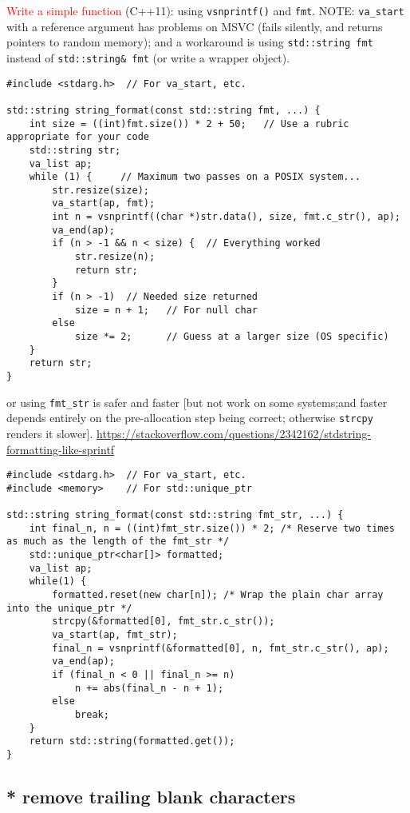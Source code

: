 \textcolor{red}{Write a simple function} (C++11): using \verb!vsnprintf()! and
\verb!fmt!. NOTE: \verb!va_start! with a reference argument has problems on
MSVC (fails silently, and returns pointers to random memory); and a workaround
is using \verb!std::string fmt! instead of \verb!std::string& fmt! (or write a
wrapper object).
\begin{lstlisting}
#include <stdarg.h>  // For va_start, etc.

std::string string_format(const std::string fmt, ...) {
    int size = ((int)fmt.size()) * 2 + 50;   // Use a rubric appropriate for your code
    std::string str;
    va_list ap;
    while (1) {     // Maximum two passes on a POSIX system...
        str.resize(size);
        va_start(ap, fmt);
        int n = vsnprintf((char *)str.data(), size, fmt.c_str(), ap);
        va_end(ap);
        if (n > -1 && n < size) {  // Everything worked
            str.resize(n);
            return str;
        }
        if (n > -1)  // Needed size returned
            size = n + 1;   // For null char
        else
            size *= 2;      // Guess at a larger size (OS specific)
    }
    return str;
}
\end{lstlisting}

or using \verb!fmt_str! is safer and faster [but not work on some systems;and
faster depends entirely on the pre-allocation step being correct; otherwise
\verb!strcpy! renders it slower]. 
\url{https://stackoverflow.com/questions/2342162/stdstring-formatting-like-sprintf}
\begin{lstlisting}
#include <stdarg.h>  // For va_start, etc.
#include <memory>    // For std::unique_ptr

std::string string_format(const std::string fmt_str, ...) {
    int final_n, n = ((int)fmt_str.size()) * 2; /* Reserve two times as much as the length of the fmt_str */
    std::unique_ptr<char[]> formatted;
    va_list ap;
    while(1) {
        formatted.reset(new char[n]); /* Wrap the plain char array into the unique_ptr */
        strcpy(&formatted[0], fmt_str.c_str());
        va_start(ap, fmt_str);
        final_n = vsnprintf(&formatted[0], n, fmt_str.c_str(), ap);
        va_end(ap);
        if (final_n < 0 || final_n >= n)
            n += abs(final_n - n + 1);
        else
            break;
    }
    return std::string(formatted.get());
}
\end{lstlisting}

\subsection{* remove trailing blank characters}

